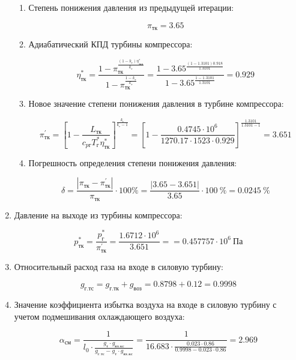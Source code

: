\documentclass[a4paper,12pt]{article}
\begin{document}
\begin{enumerate}
	\begin{enumerate}
		
		\item Степень понижения давления из предыдущей итерации:
		
		\[
		\pi_{тк} = 3.65
		\]
		
		\item Адиабатический КПД турбины компрессора:
		
		\[
		\eta_{тк}^* = \frac{1 - \pi_{тк} ^ 
	                   {\frac{\left(1 - k_г \right) \eta_{ткп}^*}{k_г}}
					}{
					   1 - \pi_{тк} ^ {\frac{1 - k_г}{k_г}} 
					} = 
				\frac{1 - 3.65 ^ 
	                   {\frac{\left(1 - 1.3101 \right) 0.918 }{ 1.3101 }}
					}{
					   1 - 3.65 ^ {\frac{ 1 - 1.3101 }{ 1.3101 }} 
					} = 
			0.929
		\]	
		
		\item Новое значение степени понижения давления в турбине компрессора:
		
		\[
		\pi_{тк}^\prime = \left[ 
							1 - \frac{L_{тк}}{c_{pг} T_г^* \eta_{тк}^*}	
						\right] ^ 
							\frac{k_г}{k_г - 1} =
					\left[ 
						1 - \frac{ 
								0.4745 \cdot 10^6  
							}{ 
								1270.17 \cdot 1523 \cdot 0.929
							}	
					\right] ^ 
						\frac{ 1.3101 }{ 1.3101 - 1} =
					3.651
		\]
		
		\item Погрешность определения степени понижения давления:
		
		\[
		\delta = \frac{ \left| \pi_{тк} - \pi_{тк}^\prime \right| }{ \pi_{тк} } \cdot 100 \% =
				\frac{ 
					\left| 3.65 - 3.651 \right|
				}{ 
					3.65 
				} \cdot 100\ \% = 
				0.0245\ \% 
		\]
	
	\end{enumerate}
	
	\item Давление на выходе из турбины компрессора:
	
	\[
	p_{тк}^* = \frac{ p_г^* }{ \pi_{тк}^\prime } = \frac{ 1.6712 \cdot 10^6 }{ 3.651 } = 
		= 0.457757 \cdot 10^6\ Па
	\]
	
	\item Относительный расход газа на входе в силовую турбину:
	
	\[ g_{г.тс} = g_{г.тк} + g_{воз} = 0.8798 + 0.12 = 0.9998 \]

	\item Значение коэффициента избытка воздуха на входе в силовую турбину с учетом подмешивания охлаждающего воздуха:

	\[
		\alpha_{см} = \frac{1}{
				l_0 \cdot \frac{g_т \cdot g_{вх.кс}}{g_{г.тс} - g_т \cdot g_{вх.кс}}
		} =
		\frac{1}{
				16.683 \cdot \frac{
					0.023 \cdot 0.86
					}{
					0.9998 -
					0.023 \cdot 0.86
			}
		} =
		2.969
	\]


\end{enumerate}
\end{document}
